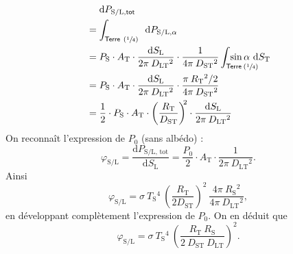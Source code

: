\documentclass[a4paper, 11pt]{article}
\begin{document}
\begin{multicols}{2}
\begin{enumerate}[start=11]
\begin{align*}
					&\mathrel{\phantom=}\mathrm{d}P_{\mathrm{S / L},\textsf{tot}}\\
					&= \int_{\mathrlap{\textsf{Terre}\ (\sfrac{1}{4})}}\quad\quad\quad\quad \mathrm{d}P_{\mathrm{S / L}, \alpha}\\
					&= P_\mathrm{S} \cdot A_\mathrm{T} \cdot \frac{\mathrm{d} S_\mathrm{L}}{2\pi\: D_\mathrm{LT}{}^2} \cdot \frac{1}{4\pi\:D_\mathrm{ST}{}^2} \int_{\mathrlap{\textsf{Terre}\:(\sfrac{1}{4})}}\: \sin \alpha~\mathrm{d}S_\mathrm{T}\\
					&= P_\mathrm{S} \cdot A_\mathrm{T} \cdot \frac{\mathrm{d} S_\mathrm{L}}{2\pi\: D_\mathrm{LT}{}^2} \cdot \frac{\pi\: R_\mathrm{T}{}^2 / 2}{4\pi\:D_\mathrm{ST}{}^2} \\
					&= \frac{1}{2} \cdot P_\mathrm{S} \cdot A_\mathrm{T} \cdot \left(\frac{R_\mathrm{T}}{D_\mathrm{ST}}\right)^{\!\!2} \cdot \frac{\mathrm{d}S_\mathrm{L}}{2\pi\:D_\mathrm{LT}{}^2} \\
				\end{align*}
				On reconnaît l'expression de $P_0$\/ (sans albédo) : \[
					\varphi_\mathrm{S/L} = \frac{\mathrm{d}P_\mathrm{S / L,\, tot}}{\mathrm{d}S_\mathrm{L}} = \frac{P_0}{2} \cdot A_\mathrm{T} \cdot \frac{1}{2\pi\:D_\mathrm{LT}{}^2}.
				\] Ainsi \[
					\varphi _\mathrm{S / L} = \sigma\: T_\mathrm{S}{}^4 \: \left( \frac{R_\mathrm{T}}{2D_\mathrm{ST}} \right)^{\!\!2}\: \frac{4\pi\:R_\mathrm{S}{}^2}{4\pi\:D_\mathrm{LT}{}^2},
				\] en développant complètement l'expression de $P_0$.
				On en déduit que \[
					\boxed{\varphi_\mathrm{S / L} = \sigma\:T_\mathrm{S}{}^4\: \left( \frac{R_\mathrm{T}\:R_\mathrm{S}}{2\:D_\mathrm{ST}\:D_\mathrm{LT}} \right)^{\!\!2}.}
				\]


\end{enumerate}
\end{multicols}
\end{document}
